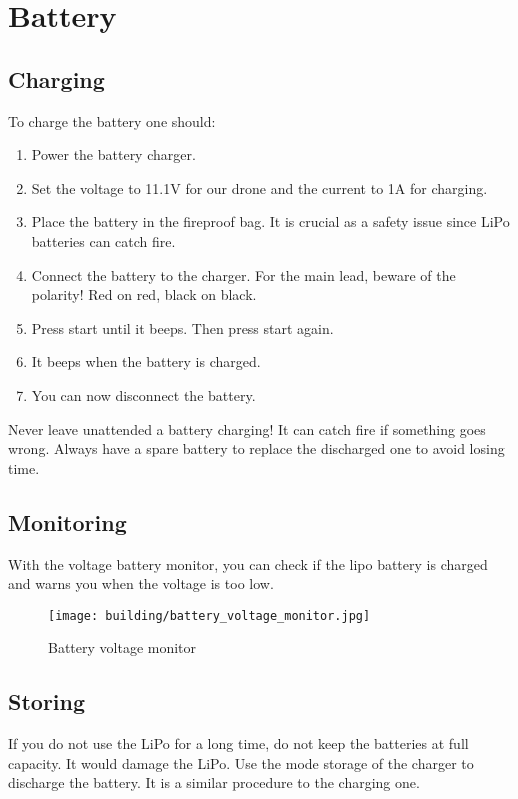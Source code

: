 \section{Battery}
\subsection{Charging}
To charge the battery one should:
\begin{enumerate}
    \item Power the battery charger.
    \item Set the voltage to 11.1V for our drone and the current to 1A for charging.
    \item Place the battery in the fireproof bag. It is crucial as a safety issue since LiPo batteries can catch fire.
    \item Connect the battery to the charger. For the main lead, beware of the polarity! Red on red, black on black.
    \item Press start until it beeps. Then press start again.
    \item It beeps when the battery is charged.
    \item You can now disconnect the battery.
\end{enumerate}
Never leave unattended a battery charging! It can catch fire if something goes wrong.
Always have a spare battery to replace the discharged one to avoid losing time.

\subsection{Monitoring}
With the voltage battery monitor, you can check if the lipo battery is charged and warns you when the voltage is too low.

\begin{figure}[!ht]
    \centering
    \texttt{[image: building/battery\_voltage\_monitor.jpg]}
    \caption{Battery voltage monitor}
    \label{fig:battery_monitor}
\end{figure}

\subsection{Storing}
If you do not use the LiPo for a long time, do not keep the batteries at full capacity. It would damage the LiPo. Use the mode storage of the charger to discharge the battery. It is a similar procedure to the charging one.

